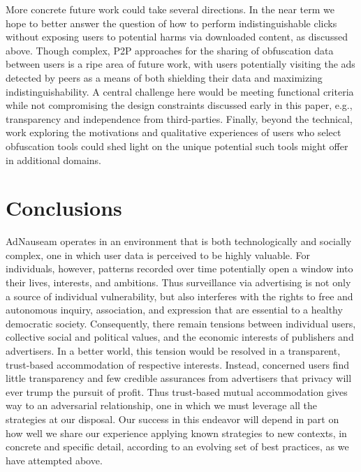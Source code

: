 \documentclass[conference]{IEEEtran}
\begin{document}
More concrete future work could take several directions. In the near term we hope to better answer the question of how to perform indistinguishable clicks without exposing users to potential harms via downloaded content, as discussed above. Though complex, P2P approaches for the sharing of obfuscation data between users is a ripe area of future work, with users potentially visiting the ads detected by peers as a means of both shielding their data and maximizing indistinguishability. A central challenge here would be meeting functional criteria while not compromising the design constraints discussed early in this paper, e.g., transparency and independence from third-parties. Finally, beyond the technical, work exploring the motivations and qualitative experiences of users who select obfuscation tools could shed light on the unique potential such tools might offer in additional domains.


\section{Conclusions}

AdNauseam operates in an environment that is both technologically and socially complex, one in which user data is perceived to be highly valuable. For individuals, however, patterns recorded over time potentially open a window into their lives, interests, and ambitions. Thus surveillance via advertising is not only a source of individual vulnerability, but also interferes with the rights to free and autonomous inquiry, association, and expression that are essential to a healthy democratic society. Consequently, there remain tensions between individual users, collective social and political values, and the economic interests of publishers and advertisers. In a better world, this tension would be resolved in a transparent, trust-based accommodation of respective interests. Instead, concerned users find little transparency and few credible assurances from advertisers that privacy will ever trump the pursuit of profit. Thus trust-based mutual accommodation gives way to an adversarial relationship, one in which we must leverage all the strategies at our disposal. Our success in this endeavor will depend in part on how well we share our experience applying known strategies to new contexts, in concrete and specific detail, according to an evolving set of best practices, as we have attempted above.
\end{document}
